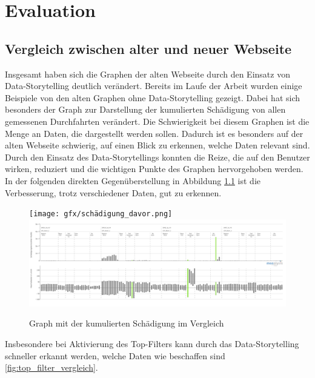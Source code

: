 \chapter{Evaluation}
\section{Vergleich zwischen alter und neuer Webseite}
Insgesamt haben sich die Graphen der alten Webseite durch den Einsatz von Data-Storytelling deutlich verändert. Bereits im Laufe der Arbeit wurden einige Beispiele von den alten Graphen ohne Data-Storytelling gezeigt. Dabei hat sich besonders der Graph zur Darstellung der kumulierten Schädigung von allen gemessenen Durchfahrten verändert. Die Schwierigkeit bei diesem Graphen ist die Menge an Daten, die dargestellt werden sollen. Dadurch ist es besonders auf der alten Webseite schwierig, auf einen Blick zu erkennen, welche Daten  relevant sind. Durch den Einsatz des Data-Storytellings konnten die Reize, die auf den Benutzer wirken, reduziert und die wichtigen Punkte des Graphen hervorgehoben werden. In der folgenden direkten Gegenüberstellung in Abbildung \ref{fig:schädigung_vergleich} ist die Verbesserung, trotz verschiedener Daten, gut zu erkennen.\\
\begin{figure}[!h]
    \centering
    \texttt{[image: gfx/schädigung\_davor.png]}
    \includegraphics[width=1\linewidth]{gfx/new_schaedigung.png}
    \caption{Graph mit der kumulierten Schädigung im Vergleich}
    \label{fig:schädigung_vergleich}
\end{figure}
\noindent
Insbesondere bei Aktivierung des Top-Filters kann durch das Data-Storytelling schneller erkannt werden, welche Daten wie beschaffen sind \ref{fig:top_filter_vergleich}. 
